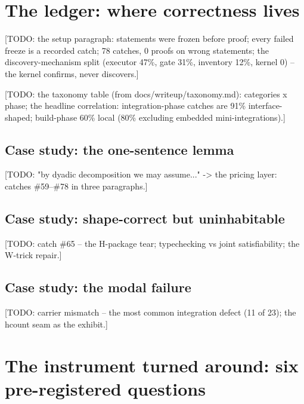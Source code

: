 \documentclass[11pt]{amsart}
\theoremstyle{remark}
\begin{document}
\section{The ledger: where correctness lives}\label{sec:ledger}

[TODO: the setup paragraph: statements were frozen before proof; every
failed freeze is a recorded catch; 78 catches, 0 proofs on wrong
statements; the discovery-mechanism split (executor 47\%, gate 31\%,
inventory 12\%, kernel 0) -- the kernel confirms, never discovers.]

[TODO: the taxonomy table (from docs/writeup/taxonomy.md): categories x
phase; the headline correlation: integration-phase catches are 91\%
interface-shaped; build-phase 60\% local (80\% excluding embedded
mini-integrations).]

\subsection{Case study: the one-sentence lemma}
[TODO: "by dyadic decomposition we may assume..." -> the pricing layer:
catches \#59--\#78 in three paragraphs.]

\subsection{Case study: shape-correct but uninhabitable}
[TODO: catch \#65 -- the H-package tear; typechecking vs joint
satisfiability; the W-trick repair.]

\subsection{Case study: the modal failure}
[TODO: carrier mismatch -- the most common integration defect (11 of 23);
the hcount seam as the exhibit.]

\section{The instrument turned around: six pre-registered questions}
\label{sec:atlas}
\end{document}
